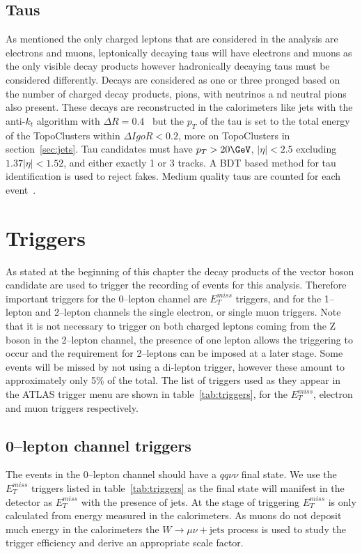 \subsection{Taus}

As mentioned the only charged leptons that are considered in the analysis are
electrons and muons, leptonically decaying taus will have electrons and muons as
the only visible decay products however hadronically decaying taus must be
considered differently. Decays are considered as one or three pronged based on
the number of charged decay products, pions, with neutrinos a
nd neutral pions
also present. These decays are reconstructed in the calorimeters like jets with
the anti-$k_t$ algorithm with $\Delta R = 0.4$~\cite{tau-reco} but the $p_T$ of
the tau is set to the total energy of the TopoClusters within $\Delta I goR < 0.2$,
more on TopoClusters in section~\ref{sec:jets}. Tau candidates must have $p_T >
20 \GeV$, $\lvert  \eta \rvert < 2.5$ excluding $1.37 \lvert \eta \rvert < 1.52$,
and either exactly 1 or 3 tracks. A BDT based method for tau identification is
used to reject fakes. Medium quality taus are counted for each event~\cite{med-taus2}.

\section{Triggers}
\label{sec:triggers}

As stated at the beginning of this chapter the decay products of the vector
boson candidate are used to trigger the recording of events for this analysis.
Therefore important triggers for the 0--lepton channel are $E_T^{miss}$ triggers,
and for the 1--lepton and 2--lepton channels the single electron, or single muon
triggers. Note that it is not necessary to trigger on both charged leptons
coming from the Z boson in the 2--lepton channel, the presence of one lepton
allows the triggering to occur and the requirement for 2--leptons can be imposed
at a later stage. Some events will be missed by not using a di-lepton trigger,
however these amount to approximately only 5\% of the total. The list of
triggers used as they appear in the ATLAS trigger menu are shown in
table~\ref{tab:triggers}, for the $E_T^{miss}$, electron and muon triggers
respectively.


\subsection{0--lepton channel triggers}
The events in the 0--lepton channel should have a $qq\nu\nu$ final state. We use
the $E_T^{miss}$ triggers listed in table~\ref{tab:triggers} as the final state
will manifest in the detector as $E_T^{miss}$ with the presence of jets. At the
stage of triggering $E_T^{miss}$ is only calculated from energy measured in the
calorimeters. As muons do not deposit much energy in the calorimeters the $W
\rightarrow \mu \nu + \text{jets}$ process is used to study the trigger
efficiency and derive an appropriate scale factor.


